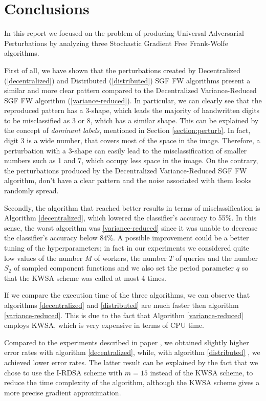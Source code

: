 \section{Conclusions}
In this report we focused on the problem of producing Universal Adversarial Perturbations by analyzing three
Stochastic Gradient Free Frank-Wolfe algorithms.

First of all, we have shown that the perturbations created by Decentralized (\ref{decentralized}) and Distributed (\ref{distributed})
SGF FW algorithms present a similar and more clear pattern compared to the Decentralized Variance-Reduced SGF FW
algorithm (\ref{variance-reduced}). In particular, we can clearly see that the reproduced pattern has a 3-shape, which
leads the majority of handwritten digits to be misclassified as 3 or 8, which has a similar shape. This can be explained by the concept of \textit{dominant labels},
mentioned in Section \ref{section:perturb}. In fact, digit 3 is a wide number, that covers most of the space in the image. Therefore, a
perturbation with a 3-shape can easily lead to the misclassification of smaller numbers such as 1 and 7, which occupy
less space in the image. On the contrary, the perturbations produced by the Decentralized Variance-Reduced SGF FW algorithm,
don't have a clear pattern and the noise associated with them looks randomly spread.

Secondly, the algorithm that reached better results in terms of misclassification is Algorithm \ref{decentralized},
which lowered the classifier's accuracy to 55\%. In this sense, the worst algorithm was \ref{variance-reduced} since
it was unable to decrease the classifier's accuracy below 84\%. A possible improvement could be a better tuning of the hyperparameters; in fact in our experiments we considered quite low values of the number $M$ of workers, the number $T$ of queries and the number $S_2$ of sampled component functions and we also set the period parameter $q$ so that the KWSA scheme was called at most 4 times. 

If we compare the execution time of the three algorithms, we can observe that algorithms \ref{decentralized} and \ref{distributed}
are much faster then algorithm \ref{variance-reduced}. This is due to the fact that Algorithm \ref{variance-reduced}
employs KWSA, which is very expensive in terms of CPU time.

Compared to the experiments described in paper \cite{A3}, we obtained slightly higher error rates with algorithm
\ref{decentralized}, while, with algorithm \ref{distributed} , we achieved lower error rates. The latter result can be
explained by the fact that we chose to use the I-RDSA scheme with $m=15$ instead of the KWSA scheme, to reduce the time
complexity of the algorithm, although the KWSA scheme gives a more precise gradient approximation. 

